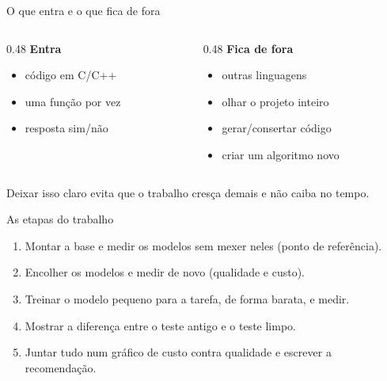 \documentclass[aspectratio=169,11pt]{beamer}
\begin{document}
\begin{frame}{O que entra e o que fica de fora}
  \begin{columns}[T,onlytextwidth]
    \begin{column}{0.48\textwidth}
      \textbf{Entra}
      \begin{itemize}
        \item código em C/C++
        \item uma função por vez
        \item resposta sim/não
      \end{itemize}
    \end{column}
    \begin{column}{0.48\textwidth}
      \textbf{Fica de fora}
      \begin{itemize}
        \item outras linguagens
        \item olhar o projeto inteiro
        \item gerar/consertar código
        \item criar um algoritmo novo
      \end{itemize}
    \end{column}
  \end{columns}
  \vspace{1.5em}
  Deixar isso claro evita que o trabalho cresça demais e não caiba no tempo.
\end{frame}

\begin{frame}{As etapas do trabalho}
  \begin{enumerate}
    \item Montar a base e medir os modelos sem mexer neles (ponto de referência).
    \item Encolher os modelos e medir de novo (qualidade e custo).
    \item Treinar o modelo pequeno para a tarefa, de forma barata, e medir.
    \item Mostrar a diferença entre o teste antigo e o teste limpo.
    \item Juntar tudo num gráfico de custo contra qualidade e escrever a recomendação.
  \end{enumerate}
\end{frame}
\end{document}
